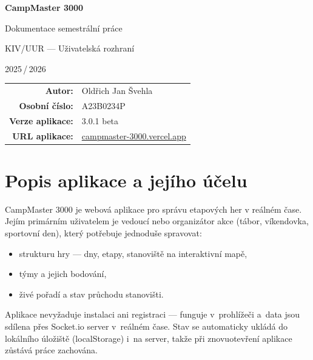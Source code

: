 ﻿\documentclass[a4paper,12pt]{article}
\begin{document}
\begin{titlepage}
  \centering
  \vspace*{3cm}
  {\LARGE\bfseries CampMaster 3000\par}
  \vspace{0.5cm}
  {\large Dokumentace semestrální práce\par}
  \vspace{2cm}
  {\large KIV/UUR — Uživatelská rozhraní\par}
  \vspace{0.5cm}
  {\large 2025\,/\,2026\par}
  \vspace{3cm}
  \begin{tabular}{rl}
    \textbf{Autor:}           & Oldřich Jan Švehla \\
    \textbf{Osobní číslo:}    & A23B0234P \\
    \textbf{Verze aplikace:}  & 3.0.1 beta \\
    \textbf{URL aplikace:}    & \href{https://campmaster-3000.vercel.app/}{campmaster-3000.vercel.app} \\
  \end{tabular}
\end{titlepage}

\tableofcontents
\newpage

\section{Popis aplikace a jejího účelu}

CampMaster 3000 je webová aplikace pro správu etapových her v reálném čase.
Jejím primárním uživatelem je vedoucí nebo organizátor akce (tábor, víkendovka,
sportovní den), který potřebuje jednoduše spravovat:

\begin{itemize}
  \item strukturu hry — dny, etapy, stanoviště na interaktivní mapě,
  \item týmy a jejich bodování,
  \item živé pořadí a stav průchodu stanovišti.
\end{itemize}

Aplikace nevyžaduje instalaci ani registraci — funguje v~prohlížeči a~data
jsou sdílena přes Socket.io server v~reálném čase. Stav se automaticky ukládá
do lokálního úložiště (localStorage) i~na server, takže při znovuotevření
aplikace zůstává práce zachována.
\end{document}
